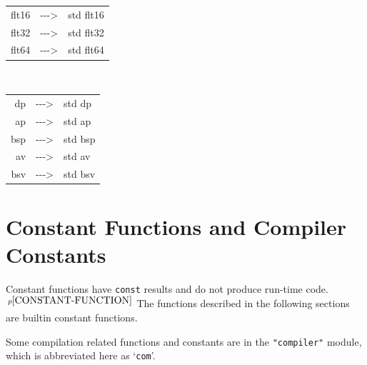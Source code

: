 \documentclass[12pt]{article}
\newcommand{\ABV}{-{}-{}->}
\newcommand{\pagnote}[1]{$\,^{p\pageref{#1}}$}
\begin{document}
\begin{center}
\begin{tabular}{rcl}
flt16		& \ABV & std flt16 \\
flt32		& \ABV & std flt32 \\
flt64		& \ABV & std flt64 \\
\end{tabular}
\\[1ex]
\begin{tabular}{rcl}
dp		& \ABV & std dp \\
ap		& \ABV & std ap \\
bsp		& \ABV & std bsp \\
av		& \ABV & std av \\
bsv		& \ABV & std bsv \\
\end{tabular}
\end{center}

\section{Constant Functions and Compiler Constants}

Constant functions have {\tt const} results
and do not produce run-time code.\pagnote{CONSTANT-FUNCTION}
The functions described in the
following sections are builtin constant functions.

Some compilation related functions and
constants are in the {\tt "compiler"} module,
which is abbreviated here as `{\tt com}'.
\end{document}
